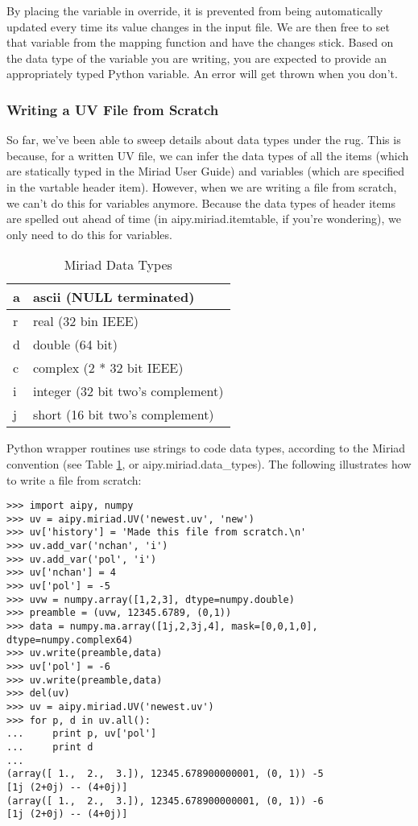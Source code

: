 By placing the variable in override, it is prevented from being
automatically updated every time its value changes in the input file.
We are then free to set that variable from the mapping function and have the
changes stick.  Based on the data type of the variable you are writing,
you are expected to provide an appropriately typed Python variable.  An
error will get thrown when you don't.

\subsubsection{Writing a UV File from Scratch}

So far, we've been able to sweep details about data types under the rug.
This is because, for a written UV file, we can infer the data types of all
the items (which are statically typed in the Miriad User Guide) and variables 
(which are specified in the vartable header item).  However, when we are
writing a file from scratch, we can't do this for variables anymore.  Because
the data types of header items are spelled out ahead of time (in
aipy.miriad.itemtable, if you're wondering), we only need to do this for
variables.

\begin{table}[ht]
\caption{Miriad Data Types}
\centering
\begin{tabular}{|l|l|}
\hline
a & ascii (NULL terminated)\\
\hline
r & real (32 bin IEEE)\\
\hline
d & double (64 bit)\\
\hline
c & complex (2 * 32 bit IEEE)\\
\hline
i & integer (32 bit two's complement)\\
\hline
j & short (16 bit two's complement)\\
\hline
\end{tabular}
\label{tbl:data_types}
\end{table}

Python wrapper routines use strings to code data types, according
to the Miriad convention (see Table \ref{tbl:data_types}, or
aipy.miriad.data\_types).  The following illustrates how to write a file
from scratch:

\begin{verbatim}
>>> import aipy, numpy
>>> uv = aipy.miriad.UV('newest.uv', 'new')
>>> uv['history'] = 'Made this file from scratch.\n'
>>> uv.add_var('nchan', 'i')
>>> uv.add_var('pol', 'i')
>>> uv['nchan'] = 4
>>> uv['pol'] = -5
>>> uvw = numpy.array([1,2,3], dtype=numpy.double)
>>> preamble = (uvw, 12345.6789, (0,1))
>>> data = numpy.ma.array([1j,2,3j,4], mask=[0,0,1,0], dtype=numpy.complex64)
>>> uv.write(preamble,data)
>>> uv['pol'] = -6
>>> uv.write(preamble,data)
>>> del(uv)
>>> uv = aipy.miriad.UV('newest.uv')
>>> for p, d in uv.all():
...     print p, uv['pol']
...     print d
...
(array([ 1.,  2.,  3.]), 12345.678900000001, (0, 1)) -5
[1j (2+0j) -- (4+0j)]
(array([ 1.,  2.,  3.]), 12345.678900000001, (0, 1)) -6
[1j (2+0j) -- (4+0j)]
\end{verbatim}

